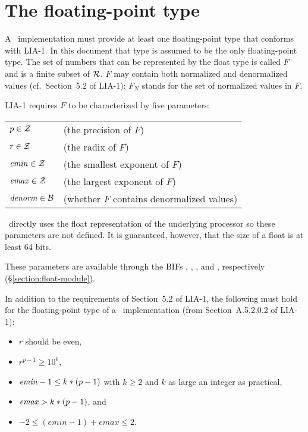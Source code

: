 \section{The floating-point type}

\label{section:float-type}

\ifStd
A \StdErlang\ implementation must provide at least one floating-point
type that conforms with LIA-1.  In this document that type is assumed
to be the only floating-point type.
\fi
{}
The set of numbers that can be
represented by the float type is called $F$ and is a finite subset of
$\mathcal{R}$.  $F$ may contain both
normalized and denormalized values (cf.~Section~5.2 of LIA-1);
$F_N$ stands for the set of normalized values in $F$.

LIA-1 requires $F$ to be characterized by five parameters:
\begin{textdisplay}
\begin{tabular}{@{}ll@{}}
$p\in\mathcal{Z}$ & (the precision of $F$) \\
$r\in\mathcal{Z}$ & (the radix of $F$) \\
${\it emin}\in\mathcal{Z}$ & (the smallest exponent of $F$) \\
${\it emax}\in\mathcal{Z}$ & (the largest exponent of $F$) \\
${\it denorm}\in\mathcal{B}$ & (whether $F$ contains denormalized values)
\end{tabular}
\end{textdisplay}

\ifOld
\OldErlang\ directly uses the float representation of the underlying
processor so these parameters are not defined.  It is guaranteed,
however, that the size of a float is at least 64 bits.
\iffalse
$r$ is $2$,
$p$ is XXX,
$\mathit{emin}$ is XXX,
$\mathit{emax}$ is XXX and
$\mathit{denorm}$ is \B{true}.
\fi\fi

\ifStd
These parameters are available through the BIFs
, ,
,
 and , respectively (\S\ref{section:float-module}).

In addition to the requirements of Section~5.2 of LIA-1, the following must
hold for the floating-point type of a \StdErlang\ implementation
(from Section~A.5.2.0.2 of LIA-1):
\begin{itemize}
\item $r$ should be even,
\item $r^{p-1}\geq 10^6$,
\item ${\it emin}-1 \leq k*(p-1)$ with $k\geq 2$ and $k$ as large an integer as practical,
\item ${\it emax} > k*(p-1)$, and
\item $-2 \leq (emin-1) + emax \leq 2$.
\end{itemize}

